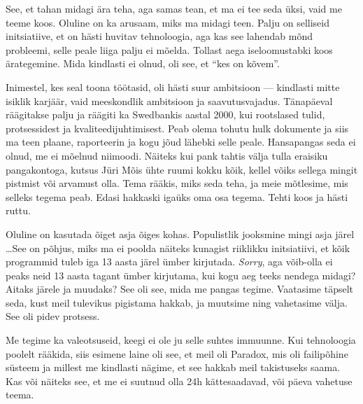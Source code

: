 See, et tahan midagi ära teha, aga samas tean, et ma ei tee seda üksi, 
vaid me teeme koos. Oluline on ka arusaam, miks ma midagi teen. Palju on selliseid initsiatiive, et on 
hästi huvitav tehnoloogia, aga kas see lahendab mõnd probleemi, selle peale liiga palju ei mõelda. Tollast aega iseloomustabki koos ärategemine. Mida 
kindlasti ei olnud, oli see, et \enquote{kes on kõvem}.

Inimestel, kes seal toona töötasid, oli hästi suur ambitsioon ---
kindlasti mitte isiklik karjäär, vaid meeskondlik ambitsioon ja 
saavutusvajadus. Tänapäeval räägitakse palju ja räägiti ka Swedbankis 
aastal 2000, kui rootslased tulid, protsessidest ja kvaliteedijuhtimisest. Peab 
olema tohutu hulk dokumente ja siis ma teen plaane, raporteerin ja 
kogu jõud lähebki selle peale. Hansapangas seda ei olnud, me ei mõelnud niimoodi. Näiteks kui pank tahtis 
välja tulla eraisiku pangakontoga, kutsus Jüri Mõis 
ühte ruumi kokku kõik, kellel võiks sellega mingit pistmist või 
arvamust olla. Tema rääkis, miks seda teha, ja meie mõtlesime, mis selleks tegema 
peab. Edasi hakkaski igaüks oma osa tegema. Tehti koos ja 
hästi ruttu. 


Oluline on kasutada õiget asja õiges kohas. Populistlik jooksmine 
mingi asja järel \ldots See on põhjus, miks ma ei poolda näiteks kunagist riiklikku initsiatiivi, 
et kõik programmid tuleb iga 13 aasta järel ümber 
kirjutada. \emph{Sorry}, aga võib-olla ei peaks neid 13 aasta tagant ümber 
kirjutama, kui kogu aeg teeks nendega midagi? Aitaks järele ja muudaks? See 
oli see, mida me pangas tegime. Vaatasime täpselt seda, kust meil tulevikus 
pigistama hakkab, ja muutsime ning vahetasime välja. See oli pidev protsess. 


Me tegime ka valeotsuseid, keegi ei ole ju selle suhtes immuunne. 
Kui tehnoloogia poolelt rääkida, siis esimene laine oli see, et meil oli 
Paradox, mis oli failipõhine süsteem ja millest me kindlasti 
nägime, et see hakkab meil takistuseks saama. Kas või näiteks see, et me ei 
suutnud olla 24h kättesaadavad, või päeva vahetuse teema. 

